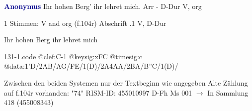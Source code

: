 \documentclass[twocolumn]{book}
\begin{document}
\newline \par \vspace{7pt} \textcolor{darkblue}{\textbf{Anonymus  }}
\newline Ihr hohen Berg' ihr lehret mich. Arr - D-Dur
\newline V, org
\newline \begin{itshape}\end{itshape} 
\newline \textcolor{darkblue}{}  1 Stimmen: V and org  (f.104r)
\newline Abschrift
.1  V, D-Dur
\newline \begin{footnotesize} Ihr hohen Berg ihr lehret mich \end{footnotesize}  
\begin{filecontents*}{131-1.code}
@clef:C-1
@keysig:xFC
@timesig:c
@data:1'D/2AB/AG/FE/1(D)/2A4AA/2BA/B''C/1(D)/
\end{filecontents*}
\newline
%
\newline Zwischen den beiden Systemen nur der Textbeginn wie angegeben
\newline Alte Zählung auf f.104r vorhanden: "74"
\newline RISM-ID: 455010997
\newline D-Fh  Ms 001
\newline $\rightarrow$ In Sammlung 418 (455008343)
      
\end{document}
